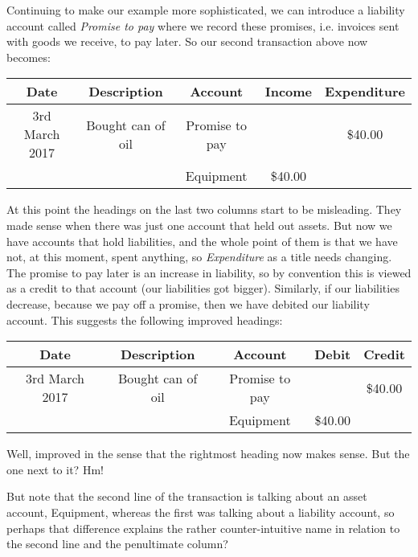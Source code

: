 \documentclass[11pt]{amsart}
\begin{document}
Continuing to make our example more sophisticated, we can introduce a liability account called \emph{Promise to pay} where we record these promises, i.e. invoices sent with goods we receive, to pay later. So our second transaction above now becomes:

\begin{table}[h]
\begin{center}
\begin{tabular}{|c|c|c|c|c|}
Date & Description & Account & Income & Expenditure\\
\hline \hline
3rd March 2017 &  Bought can of oil & Promise to pay & & \$40.00  \\
\hline
&  &  Equipment & \$40.00 & 
\end{tabular}
\end{center}
\label{default}
\end{table}%

At this point the headings on the last two columns start to be misleading. They made sense when there was just one account that held out assets. But now we have accounts that hold liabilities, and the whole point of them is that we have not, at this moment, spent anything, so \emph{Expenditure} as a title needs changing. The promise to pay later is an increase in liability, so by convention this is viewed as a credit to that account (our liabilities got bigger). Similarly, if our liabilities decrease, because we pay off a promise, then we have debited our liability account. This suggests the following improved headings:

\begin{table}[h]
\begin{center}
\begin{tabular}{|c|c|c|c|c|}
Date & Description & Account & Debit & Credit\\
\hline \hline
3rd March 2017 &  Bought can of oil & Promise to pay & & \$40.00  \\
\hline
&  &  Equipment & \$40.00 & 
\end{tabular}
\end{center}
\label{default}
\end{table}%

Well, improved in the sense that the rightmost heading now makes sense. But the one next to it? Hm!

But note that the second line of the transaction is talking about an asset account, Equipment, whereas the first was talking about a liability account, so perhaps that difference explains the rather counter-intuitive name in relation to the second line and the penultimate column?
\end{document}
